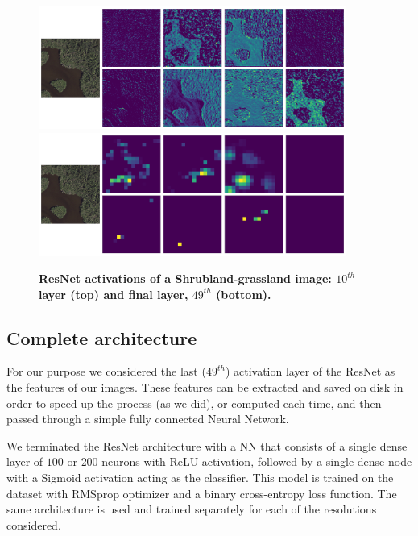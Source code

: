 \begin{figure}[H]
	\centering
	\includegraphics[width=0.9\textwidth]{Figures/activations/shrubland-grassland_l0_s1_activation_10.png}
	\includegraphics[width=0.9\textwidth]{Figures/activations/shrubland-grassland_l0_s1_activation_49.png}
	\captionsetup{width=1\linewidth}
	\caption{\textbf{ResNet activations of a Shrubland-grassland image: $10^{th}$ layer (top) and final layer, $49^{th}$ (bottom).}}
	\label{fig:act_shrubland_grassland}
\end{figure}


\subsection{Complete architecture}

For our purpose we considered the last ($49^{th}$) activation layer of the ResNet as the features of our images. These features can be extracted and saved on disk in order to speed up the process (as we did), or computed each time, and then passed through a simple fully connected Neural Network.

We terminated the ResNet architecture with a NN that consists of a single dense layer of $100$ or $200$ neurons with ReLU activation, followed by a single dense node with a Sigmoid activation acting as the classifier. This model is trained on the dataset with RMSprop optimizer \parencite{ruder2016} and a binary cross-entropy loss function. The same architecture is used and trained separately for each of the resolutions considered. 


